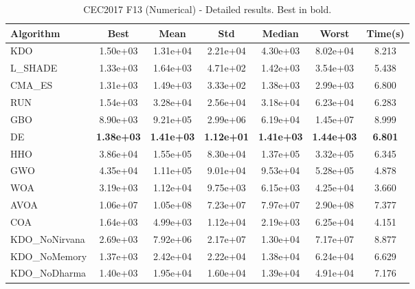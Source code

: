 \begin{table}[H]
\centering\small
\caption{CEC2017 F13 (Numerical) - Detailed results. Best in bold.}
\label{tab:cec2017_F13}
\begin{tabular}{lcccccc}
\toprule
\textbf{Algorithm} & \textbf{Best} & \textbf{Mean} & \textbf{Std} & \textbf{Median} & \textbf{Worst} & \textbf{Time(s)} \\
\midrule
KDO & 1.50e+03 & 1.31e+04 & 2.21e+04 & 4.30e+03 & 8.02e+04 & 8.213 \\
L_SHADE & 1.33e+03 & 1.64e+03 & 4.71e+02 & 1.42e+03 & 3.54e+03 & 5.438 \\
CMA_ES & 1.31e+03 & 1.49e+03 & 3.33e+02 & 1.38e+03 & 2.99e+03 & 6.800 \\
RUN & 1.54e+03 & 3.28e+04 & 2.56e+04 & 3.18e+04 & 6.23e+04 & 6.283 \\
GBO & 8.90e+03 & 9.21e+05 & 2.99e+06 & 6.19e+04 & 1.45e+07 & 8.999 \\
DE & \textbf{1.38e+03} & \textbf{1.41e+03} & \textbf{1.12e+01} & \textbf{1.41e+03} & \textbf{1.44e+03} & \textbf{6.801} \\
HHO & 3.86e+04 & 1.55e+05 & 8.30e+04 & 1.37e+05 & 3.32e+05 & 6.345 \\
GWO & 4.35e+04 & 1.11e+05 & 9.01e+04 & 9.53e+04 & 5.28e+05 & 4.878 \\
WOA & 3.19e+03 & 1.12e+04 & 9.75e+03 & 6.15e+03 & 4.25e+04 & 3.660 \\
AVOA & 1.06e+07 & 1.05e+08 & 7.23e+07 & 7.97e+07 & 2.90e+08 & 7.377 \\
COA & 1.64e+03 & 4.99e+03 & 1.12e+04 & 2.19e+03 & 6.25e+04 & 4.151 \\
KDO_NoNirvana & 2.69e+03 & 7.92e+06 & 2.17e+07 & 1.30e+04 & 7.17e+07 & 8.877 \\
KDO_NoMemory & 1.37e+03 & 2.42e+04 & 2.22e+04 & 1.38e+04 & 6.24e+04 & 6.629 \\
KDO_NoDharma & 1.40e+03 & 1.95e+04 & 1.60e+04 & 1.39e+04 & 4.91e+04 & 7.176 \\
\bottomrule
\end{tabular}
\end{table}
